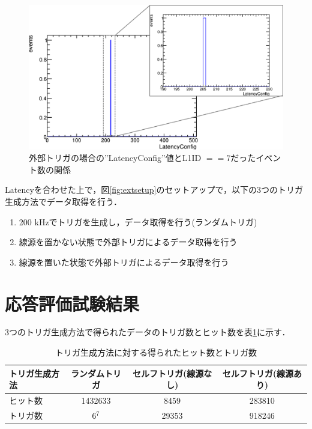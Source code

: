 \begin{figure}[h]
  \centering
  \includegraphics[width=14cm]{./figure/ExtLatencyDist.png}
  \caption{外部トリガの場合の''LatencyConfig''値とL1ID $== 7$だったイベント数の関係}
  \label{fig:exttriglatency}
\end{figure}

Latencyを合わせた上で，図\ref{fig:extsetup}のセットアップで，以下の3つのトリガ生成方法でデータ取得を行う．
\begin{enumerate}
\item 200 $\mathrm{kHz}$でトリガを生成し，データ取得を行う(ランダムトリガ)
\item 線源を置かない状態で外部トリガによるデータ取得を行う
\item 線源を置いた状態で外部トリガによるデータ取得を行う
\end{enumerate}


\section{応答評価試験結果}
\label{sec:extconc}
3つのトリガ生成方法で得られたデータのトリガ数とヒット数を表\ref{tab:ext}に示す．

\begin{table}[h]
  \label{tab:ext}
  \centering
  \caption{トリガ生成方法に対する得られたヒット数とトリガ数}
  \begin{tabular} {l|ccc} \hline 
    トリガ生成方法 & ランダムトリガ & セルフトリガ(線源なし) & セルフトリガ(線源あり) \\ \hline \hline
    ヒット数 & 1432633 & 8459 & 283810 \\
    トリガ数 & $6 \time 10^7$ & 29353 & 918246 \\ \hline
  \end{tabular}
\end{table}

